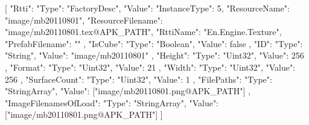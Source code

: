 [{
        "Rtti": {
            "Type": "FactoryDesc",
            "Value": {
                "InstanceType": 5,
                "ResourceName": "image/mb20110801",
                "ResourceFilename": "image/mb20110801.tex@APK_PATH",
                "RttiName": "En.Engine.Texture",
                "PrefabFilename": ""
            }
        },
        "IsCube": {
            "Type": "Boolean",
            "Value": false
        },
        "ID": {
            "Type": "String",
            "Value": "image/mb20110801"
        },
        "Height": {
            "Type": "Uint32",
            "Value": 256
        },
        "Format": {
            "Type": "Uint32",
            "Value": 21
        },
        "Width": {
            "Type": "Uint32",
            "Value": 256
        },
        "SurfaceCount": {
            "Type": "Uint32",
            "Value": 1
        },
        "FilePaths": {
            "Type": "StringArray",
            "Value": ["image/mb20110801.png@APK_PATH"]
        },
        "ImageFilenamesOfLoad": {
            "Type": "StringArray",
            "Value": ["image/mb20110801.png@APK_PATH"]
        }
    }]